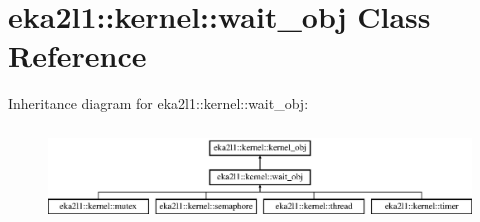 \hypertarget{classeka2l1_1_1kernel_1_1wait__obj}{}\section{eka2l1\+:\+:kernel\+:\+:wait\+\_\+obj Class Reference}
\label{classeka2l1_1_1kernel_1_1wait__obj}
Inheritance diagram for eka2l1\+:\+:kernel\+:\+:wait\+\_\+obj\+:\begin{figure}[H]
\begin{center}
\leavevmode
\includegraphics[height=2.530120cm]{classeka2l1_1_1kernel_1_1wait__obj}
\end{center}
\end{figure}
